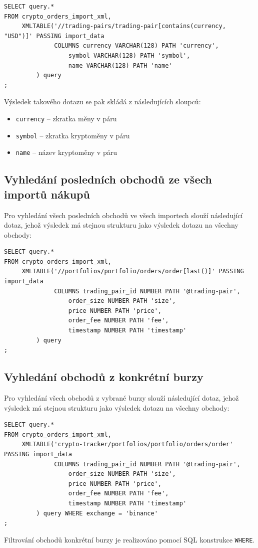 \documentclass[12pt, a4paper]{article}
\begin{document}
\begin{lstlisting}
SELECT query.*
FROM crypto_orders_import_xml,
     XMLTABLE('//trading-pairs/trading-pair[contains(currency, "USD")]' PASSING import_data
              COLUMNS currency VARCHAR(128) PATH 'currency',
                  symbol VARCHAR(128) PATH 'symbol',
                  name VARCHAR(128) PATH 'name'
         ) query
;

\end{lstlisting}

\noindent
Výsledek takového dotazu se pak skládá z následujících sloupců:
\begin{itemize}
    \item \texttt{currency} -- zkratka měny v páru
    \item \texttt{symbol} -- zkratka kryptoměny v páru
    \item \texttt{name} -- název kryptoměny v páru
\end{itemize}


\subsection{Vyhledání posledních obchodů ze všech importů nákupů}
Pro vyhledání všech posledních obchodů ve všech importech slouží následující dotaz, jehož výsledek má stejnou strukturu jako výsledek dotazu na všechny obchody:

\begin{lstlisting}
SELECT query.*
FROM crypto_orders_import_xml,
     XMLTABLE('//portfolios/portfolio/orders/order[last()]' PASSING import_data
              COLUMNS trading_pair_id NUMBER PATH '@trading-pair',
                  order_size NUMBER PATH 'size',
                  price NUMBER PATH 'price',
                  order_fee NUMBER PATH 'fee',
                  timestamp NUMBER PATH 'timestamp'
         ) query
;
\end{lstlisting}


\subsection{Vyhledání obchodů z konkrétní burzy}
Pro vyhledání všech obchodů z vybrané burzy slouží následující dotaz, jehož výsledek má stejnou strukturu jako výsledek dotazu na všechny obchody:

\begin{lstlisting}
SELECT query.*
FROM crypto_orders_import_xml,
     XMLTABLE('crypto-tracker/portfolios/portfolio/orders/order' PASSING import_data
              COLUMNS trading_pair_id NUMBER PATH '@trading-pair',
                  order_size NUMBER PATH 'size',
                  price NUMBER PATH 'price',
                  order_fee NUMBER PATH 'fee',
                  timestamp NUMBER PATH 'timestamp'
         ) query WHERE exchange = 'binance'
;
\end{lstlisting}

Filtrování obchodů konkrétní burzy je realizováno pomocí SQL konstrukce \texttt{WHERE}.
\end{document}
